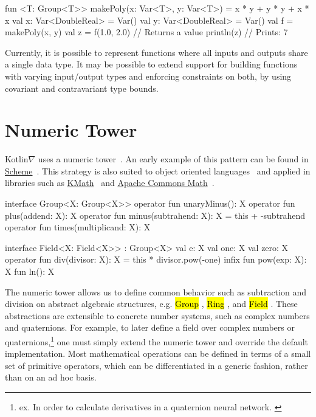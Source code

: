 \documentclass[12pt,initial,twoside,maitrise]{dms}
\newcommand{\inline}[1]{%
    \begingroup%
    \sethlcolor{slightgray}%
    \hl{\ttfamily\footnotesize #1}%
    \endgroup
}
\numberwithin{equation}{section}
\numberwithin{table}{chapter}
\numberwithin{figure}{chapter}
\begin{document}
\begin{kotlinlisting}
fun <T: Group<T>> makePoly(x: Var<T>, y: Var<T>) = x * y + y * y + x * x
val x: Var<DoubleReal> = Var()
val y: Var<DoubleReal> = Var()
val f = makePoly(x, y)
val z = f(1.0, 2.0) // Returns a value
println(z) // Prints: 7
\end{kotlinlisting}
%
Currently, it is possible to represent functions where all inputs and outputs share a single data type. It may be possible to extend support for building functions with varying input/output types and enforcing constraints on both, by using covariant and contravariant type bounds.

\section{Numeric Tower}\label{sec:numeric-tower}

Kotlin$\nabla$ uses a numeric tower~\citep{st2012typing}. An early example of this pattern can be found in \href{https://www.gnu.org/software/guile/manual/html_node/Numerical-Tower.html}{Scheme}~\citep{sperber2009revised}. This strategy is also suited to object oriented languages~\citep{niculescu2003design, niculescu2011using, kennedy2005generalized} and applied in libraries such as \href{https://github.com/mipt-npm/kmath}{KMath}~\citep{nozik2019kmath} and \href{https://commons.apache.org/proper/commons-math/}{Apache Commons Math}~\citep{developers2012apache}.

\begin{kotlinlisting}
interface Group<X: Group<X>> {
    operator fun unaryMinus(): X
    operator fun plus(addend: X): X
    operator fun minus(subtrahend: X): X = this + -subtrahend
    operator fun times(multiplicand: X): X
}

interface Field<X: Field<X>> : Group<X> {
    val e: X
    val one: X
    val zero: X
    operator fun div(divisor: X): X = this * divisor.pow(-one)
    infix fun pow(exp: X): X
    fun ln(): X
}
\end{kotlinlisting}
%
The numeric tower allows us to define common behavior such as subtraction and division on abstract algebraic structures, e.g. \inline{Group}, \inline{Ring}, and \inline{Field}. These abstractions are extensible to concrete number systems, such as complex numbers and quaternions. For example, to later define a field over complex numbers or quaternions,\hspace{-.08em}\footnote{ex. In order to calculate derivatives in a quaternion neural network. \citep{isokawa2003quaternion}} one must simply extend the numeric tower and override the default implementation. Most mathematical operations can be defined in terms of a small set of primitive operators, which can be differentiated in a generic fashion, rather than on an ad hoc basis.
\end{document}
